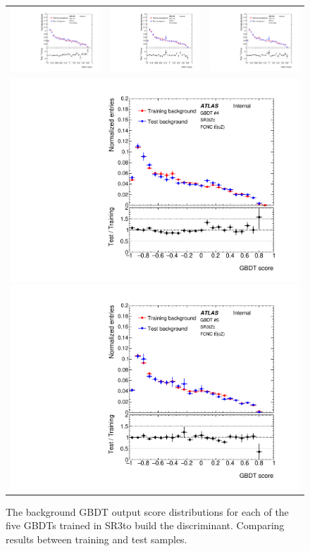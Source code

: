 \begin{figure}[!htbp]
	\centering
	\begin{tabular}{ccc}
		\includegraphics[width=.29\textwidth]{Chapters/CH6/figures/SR3_UsingSMT/BDT/GBDT_background_Fold1} &
		\includegraphics[width=.29\textwidth]{Chapters/CH6/figures/SR3_UsingSMT/BDT/GBDT_background_Fold2} &
		\includegraphics[width=.29\textwidth]{Chapters/CH6/figures/SR3_UsingSMT/BDT/GBDT_background_Fold3} \\ 
		\multicolumn{3}{c}{
		\includegraphics[width=.29\textwidth]{Chapters/CH6/figures/SR3_UsingSMT/BDT/GBDT_background_Fold4}
		\includegraphics[width=.29\textwidth]{Chapters/CH6/figures/SR3_UsingSMT/BDT/GBDT_background_Fold5}} \\
	\end{tabular}
	\caption{ The background GBDT output score distributions for each of the five GBDTs trained in SR3\tZc to build the \Dthree discriminant. 
		Comparing results between training and test samples.
	}%
	\label{fig:separation:SR3:GBDTbkg}
\end{figure}


